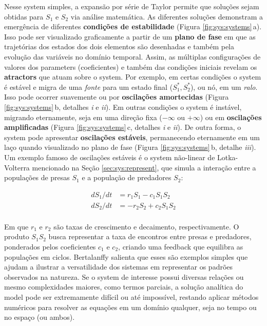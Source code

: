 \documentclass[./main.tex]{subfiles}
\begin{document}
Nesse \gls{system} simples, a expansão por série de Taylor permite que soluções sejam obtidas para $S_1$ e $S_2$ via análise matemática. As diferentes soluções demonstram a emergência de diferentes \textbf{condições de estabilidade} (Figura \ref{fig:sys:systems}\,a). Isso pode ser visualizado graficamente a partir de um \textbf{plano de fase} em que as trajetórias dos estados dos dois elementos são desenhadas e também pela evolução das variáveis no domínio temporal. Assim, as múltiplas configurações de valores dos \gls{parameters} (coeficientes) e também das condições iniciais revelam os \textbf{\gls{atractors}} que atuam sobre o \gls{system}. Por exemplo, em certas condições o \gls{system} é estável e migra de uma \textit{fonte} para um estado final ($S^*_1, S^*_2$), ou nó, em um \textit{ralo}. Isso pode ocorrer suavemente ou por \textbf{oscilações amortecidas} (Figura \ref{fig:sys:systems}\,b, detalhes \textrm{\textit{i}} e \textrm{\textit{ii}}). Em outras condições o \gls{system} é instável, migrando eternamente, seja em uma direção fixa ($-\infty$ ou $+\infty$) ou em \textbf{oscilações amplificadas} (Figura \ref{fig:sys:systems}\,c, detalhes \textrm{\textit{i}} e \textrm{\textit{ii}}). De outra forma, o \gls{system} pode apresentar \textbf{oscilações estáveis}, permanecendo eternamente em um laço quando visualizado no plano de fase (Figura \ref{fig:sys:systems}\,b, detalhe \textrm{\textit{iii}}). Um exemplo famoso de oscilações estáveis é o \gls{system} não-linear de Lotka-Volterra mencionado na Seção \ref{sec:sys:represent}, que simula a interação entre a populações de presas $S_1$ e a população de predadores $S_2$:
\begin{linenomath*}
\[
\begin{split}
    dS_1/dt &= r_{1}S_1 - c_{1}S_1S_2\\
    dS_2/dt &= -r_{2}S_2 + c_{2}S_1S_2\\
\end{split}
\]
\end{linenomath*}
Em que $r_1$ e $r_2$ são taxas de crescimento e decaimento, respectivamente. O produto $S_1S_2$ busca representar a taxa de encontros entre presas e predadores, ponderados pelos coeficientes $c_1$ e $c_2$, criando uma \gls{feedback} que equilibra as populações em ciclos. Bertalanffy salienta que esses são exemplos simples que ajudam a ilustrar a versatilidade dos sistemas em representar os padrões observados na natureza. Se o \gls{system} de interesse possui diversas relações ou mesmo complexidades maiores, como termos parciais, a solução analítica do \gls{model} pode ser extremamente difícil ou até impossível, restando aplicar métodos numéricos para resolver as equações em um domínio qualquer, seja no tempo ou no espaço (ou ambos).
\end{document}
